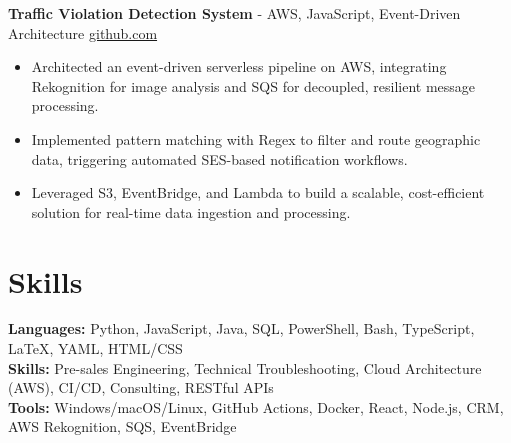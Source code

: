\documentclass[11pt]{article}       %
\begin{document}
\textbf{Traffic Violation Detection System}{ - AWS, JavaScript, Event-Driven Architecture} \hfill \href{https://github.com/Monica20030707/AWS_rekonigition-N-read-database}{github.com} \\
\vspace{-9pt}
\begin{itemize}
  \item Architected an event-driven serverless pipeline on AWS, integrating Rekognition for image analysis and SQS for decoupled, resilient message processing.
  \item Implemented pattern matching with Regex to filter and route geographic data, triggering automated SES-based notification workflows.
  \item Leveraged S3, EventBridge, and Lambda to build a scalable, cost-efficient solution for real-time data ingestion and processing.
\end{itemize}

\vspace{-18.5pt}


\section*{Skills}
\textbf{Languages:} Python, JavaScript, Java, SQL, PowerShell, Bash, TypeScript, LaTeX, YAML, HTML/CSS\\
\textbf{Skills:} Pre-sales Engineering, Technical Troubleshooting, Cloud Architecture (AWS), CI/CD, Consulting, RESTful APIs\\
\textbf{Tools:} Windows/macOS/Linux, GitHub Actions, Docker, React, Node.js, CRM, AWS Rekognition, SQS, EventBridge\\

\vspace{-6.5pt}
\end{document}
